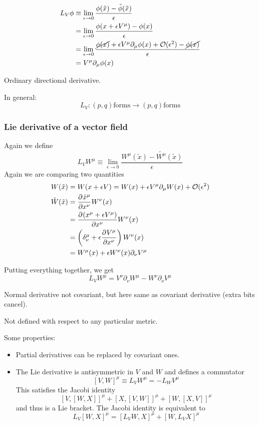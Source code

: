 \begin{align}
L_V\phi &\equiv \lim_{\epsilon\to 0}\frac{\phi(\tilde{x}) - \tilde{\phi}(\tilde{x})}{\epsilon} \\
&= \lim_{\epsilon\to 0}\frac{\phi(x+\epsilon V^\mu)-\phi(x)}{\epsilon} \\
&= \lim_{\epsilon\to 0}\frac{\cancel{\phi(x)}+\epsilon V^\mu\partial_\mu\phi(x)+\mathcal{O}(\epsilon^2)-\cancel{\phi(x)}}{\epsilon} \\
&= V^\mu\partial_\mu\phi(x)
\end{align}

Ordinary directional derivative.

In general:
\[ L_V: (p,q) \text{forms} \to (p,q) \text{forms} \]

\subsubsection{Lie derivative of a vector field}
Again we define
\[ L_VW^\mu \equiv \lim_{\epsilon\to 0}\frac{W^\mu(\tilde{x}) - \tilde{W^\mu}(\tilde{x})}{\epsilon} \]
Again we are comparing two quantities
\begin{align}
W(\tilde{x}) &= W(x + \epsilon V) = W(x) + \epsilon V^\mu\partial_\mu W(x) + \mathcal{O}(\epsilon^2) \\
\tilde{W}(\tilde{x}) &=  \frac{\partial{^{}}\tilde{x}^\mu}{\partial{{x^\nu}^{}}} W^\nu (x) \\
&=  \frac{\partial{^{}}(x^\mu+\epsilon V^\mu)}{\partial{{x^\nu}^{}}} W^\nu (x) \\
&= \left(\delta^\mu_\nu+\epsilon  \frac{\partial{^{}}V^\mu}{\partial{{x^\nu}^{}}} \right)W^\nu (x) \\
&= W^\mu (x)+\epsilon W^\nu (x)\partial_\nu V^\mu
\end{align}

Putting everything together, we get
\[ L_V W^\mu = V^\nu\partial_\nu W^\mu - W^\nu \partial_\nu V^\mu \]

Normal derivative not covariant, but here same as covariant derivative (extra bits cancel).

Not defined with respect to any particular metric.

Some properties:
\begin{itemize}
\item Partial derivatives can be replaced by covariant ones.
\item The Lie derivative is antisymmetric in $V$ and $W$ and defines a commutator
\[ [V,W]^\mu \equiv L_VW^\mu = - L_WV^\mu \]
This satisfies the Jacobi identity 
\[ [V,[W,X]]^\mu + [X,[V,W]]^\mu + [W,[X,V]]^\mu \]
and thus is a Lie bracket.  The Jacobi identity is equivalent to
\[ L_V[W,X]^\mu = [L_VW,X]^\mu + [W,L_VX]^\mu \]
\end{itemize}


